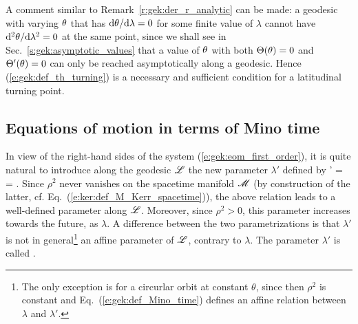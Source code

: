 \begin{remark}
A comment similar to Remark~\ref{r:gek:der_r_analytic} can be made:
a geodesic with varying $\theta$ that has $\mathrm{d}\theta/\mathrm{d}\lambda = 0$ for some finite
value of $\lambda$
cannot have $\mathrm{d}^2\theta/\mathrm{d}\lambda^2 = 0$ at the same point, since we shall see
in Sec.~\ref{s:gek:asymptotic_values}
that a value of $\theta$ with both $\Theta(\theta)=0$
and $\Theta'(\theta)=0$ can only be reached asymptotically along a geodesic.
Hence (\ref{e:gek:def_th_turning})
is a necessary and sufficient condition for a latitudinal turning point.
\end{remark}


\subsection{Equations of motion in terms of Mino time} \label{s:gek:Mino_time}

In view of the right-hand sides of the system (\ref{e:gek:eom_first_order}),
it is quite natural to introduce along the geodesic $\mathscr{L}$ the new
parameter $\lambda'$ defined by
\be \label{e:gek:def_Mino_time}
    \D\lambda' = 
     =  .
\ee
Since $\rho^2$ never vanishes on the spacetime manifold $\mathscr{M}$ (by construction
of the latter, cf. Eq.~(\ref{e:ker:def_M_Kerr_spacetime})), the above relation
leads to a well-defined parameter along $\mathscr{L}$. Moreover, since $\rho^2>0$, this
parameter increases towards the future, as $\lambda$. A difference between
the two parametrizations is that $\lambda'$ is not in general\footnote{The only
exception is for a circurlar orbit at constant $\theta$, since then $\rho^2$
is constant and Eq.~(\ref{e:gek:def_Mino_time}) defines an affine relation
between $\lambda$ and $\lambda'$.} an affine parameter
of $\mathscr{L}$, contrary to $\lambda$.
The parameter $\lambda'$ is called 
\cite{Mino03}.

